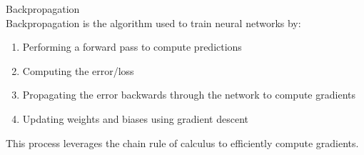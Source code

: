 \begin{definition}{Backpropagation}\\
Backpropagation is the algorithm used to train neural networks by:
\begin{enumerate}
    \item Performing a forward pass to compute predictions
    \item Computing the error/loss
    \item Propagating the error backwards through the network to compute gradients
    \item Updating weights and biases using gradient descent
\end{enumerate}
This process leverages the chain rule of calculus to efficiently compute gradients.
\end{definition}

